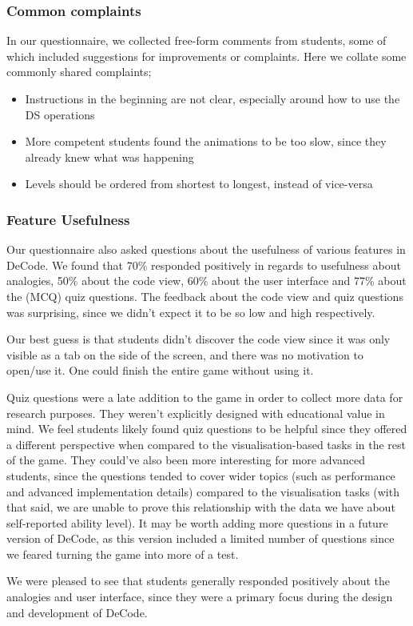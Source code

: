 \documentclass[11pt]{article}
\begin{document}
\subsubsection{Common complaints}
In our questionnaire, we collected free-form comments from students, some of which included suggestions for improvements or complaints. Here we collate some commonly shared complaints;
\begin{spacing}{1.5}
\begin{itemize}
  \item Instructions in the beginning are not clear, especially around how to use the DS operations
  \item More competent students found the animations to be too slow, since they already knew what was happening
  \item Levels should be ordered from shortest to longest, instead of vice-versa
\end{itemize}
\end{spacing}
\subsubsection{Feature Usefulness}
Our questionnaire also asked questions about the usefulness of various features in DeCode. We found that 70\% responded positively in regards to usefulness about analogies, 50\% about the code view, 60\% about the user interface and 77\% about the (MCQ) quiz questions. The feedback about the code view and quiz questions was surprising, since we didn't expect it to be so low and high respectively.\par
Our best guess is that students didn't discover the code view since it was only visible as a tab on the side of the screen, and there was no motivation to open/use it. One could finish the entire game without using it.\par
Quiz questions were a late addition to the game in order to collect more data for research purposes. They weren't explicitly designed with educational value in mind. We feel students likely found quiz questions to be helpful since they offered a different perspective when compared to the visualisation-based tasks in the rest of the game. They could've also been more interesting for more advanced students, since the questions tended to cover wider topics (such as performance and advanced implementation details) compared to the visualisation tasks (with that said, we are unable to prove this relationship with the data we have about self-reported ability level). It may be worth adding more questions in a future version of DeCode, as this version included a limited number of questions since we feared turning the game into more of a test.\par
We were pleased to see that students generally responded positively about the analogies and user interface, since they were a primary focus during the design and development of DeCode.
\end{document}

